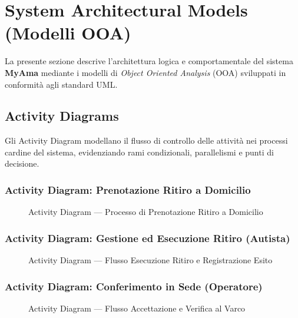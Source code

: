 \section{System Architectural Models (Modelli OOA)}

La presente sezione descrive l'architettura logica e comportamentale del sistema \textbf{MyAma} mediante i modelli di \textit{Object Oriented Analysis} (OOA) sviluppati in conformità agli standard UML.

\subsection{Activity Diagrams}
Gli Activity Diagram modellano il flusso di controllo delle attività nei processi cardine del sistema, evidenziando rami condizionali, parallelismi e punti di decisione.

\subsubsection{Activity Diagram: Prenotazione Ritiro a Domicilio}
\begin{figure}[H]
    \centering
    \caption{Activity Diagram --- Processo di Prenotazione Ritiro a Domicilio}
    \label{fig:act_ritiro}
\end{figure}

\subsubsection{Activity Diagram: Gestione ed Esecuzione Ritiro (Autista)}
\begin{figure}[H]
    \centering
    \caption{Activity Diagram --- Flusso Esecuzione Ritiro e Registrazione Esito}
    \label{fig:act_autista}
\end{figure}

\subsubsection{Activity Diagram: Conferimento in Sede (Operatore)}
\begin{figure}[H]
    \centering
    \caption{Activity Diagram --- Flusso Accettazione e Verifica al Varco}
    \label{fig:act_sede}
\end{figure}

